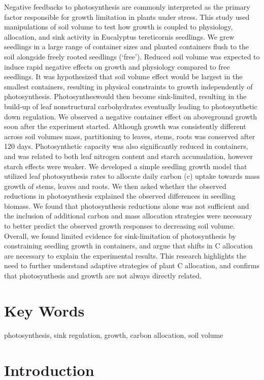 \documentclass[a4paper]{article}\usepackage[]{graphicx}\usepackage[]{color}
\begin{document}
Negative feedbacks to photosynthesis are commonly interpreted as the primary factor responsible for growth limitation in plants under stress.  This study used manipulations of soil volume to test how growth is coupled to physiology, allocation, and sink activity in Eucalyptus tereticornis seedlings. We grew seedlings in a large range of container sizes and planted containers flush to the soil alongside freely rooted seedlings (‘free’). Reduced soil volume was expected to induce rapid negative effects on growth and physiology compared to free seedlings. It was hypothesized that soil volume effect would be largest in the smallest containers, resulting in physical constraints to growth independently of photosynthesis. Photosyntheswould then become sink-limited, resulting in the build-up of leaf nonstructural carbohydrates eventually leading to photosynthetic down regulation. We observed a negative container effect on aboveground growth soon after the experiment started. Although growth was consistently different across soil volumes mass, partitioning to leaves, stems, roots was conserved after 120 days. Photosynthetic capacity was also significantly reduced in containers, and was related to both leaf nitrogen content and starch accumulation, however starch effects were weaker. We developed a simple seedling growth model that utilized leaf photosynthesis rates to allocate daily carbon (c) uptake towards mass growth of stems, leaves and roots. We then asked whether the observed reductions in photosynthesis explained the observed differences in seedling biomass.  We found that photosynthesis reductions alone was not sufficient and the inclusion of additional carbon and mass allocation strategies were necessary to better predict the observed growth responses to decreasing soil volume. Overall, we found limited evidence for sink-limitation of photosynthesis by constraining seedling growth in containers, and argue that shifts in C allocation are necessary to explain the experimental results. This research highlights the need to further understand adaptive strategies of plant C allocation, and confirms that photosynthesis and growth are not always directly related.

\section*{Key Words}

photosynthesis, sink regulation, growth, carbon allocation, soil volume


\section*{Introduction}
\end{document}
